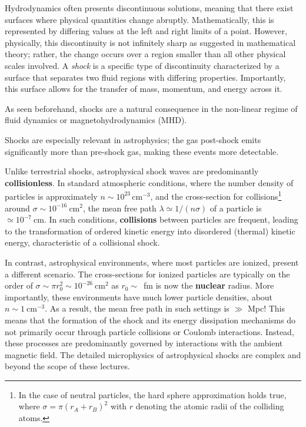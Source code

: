 Hydrodynamics often presents discontinuous solutions, meaning that there exist surfaces where physical quantities change abruptly. Mathematically, this is represented by differing values at the left and right limits of a point. However, physically, this discontinuity is not infinitely sharp as suggested in mathematical theory; rather, the change occurs over a region smaller than all other physical scales involved. 
%
A \emph{shock} is a specific type of discontinuity characterized by a surface that separates two fluid regions with differing properties. Importantly, this surface allows for the transfer of mass, momentum, and energy across it.

As seen beforehand, shocks are a natural consequence in the non-linear regime of fluid dynamics or magnetohydrodynamics (MHD).

Shocks are especially relevant in astrophysics; the gas post-shock emits significantly more than pre-shock gas, making these events more detectable.

Unlike terrestrial shocks, astrophysical shock waves are predominantly \textbf{collisionless}. 
%
In standard atmospheric conditions, where the number density of particles is approximately \( n \sim 10^{23} \, \text{cm}^{-3} \), and the cross-section for collisions\footnote{In the case of neutral particles, the hard sphere approximation holds true, where \( \sigma = \pi (r_A + r_B)^2 \) with \( r \) denoting the atomic radii of the colliding atoms.} around \( \sigma \sim 10^{-16}~\text{cm}^2 \), the mean free path \( \lambda \simeq 1 / (n \sigma) \) of a particle is \( \simeq 10^{-7}~\text{cm} \). 
%
In such conditions, \textbf{collisions} between particles are frequent, leading to the transformation of ordered kinetic energy into disordered (thermal) kinetic energy, characteristic of a collisional shock.

In contrast, astrophysical environments, where most particles are ionized, present a different scenario. The cross-sections for ionized particles are typically on the order of \( \sigma \sim \pi r_0^2 \sim 10^{-26}~\text{cm}^2 \) as $r_0 \sim$~fm is now the \textbf{nuclear} radius.
%
More importantly, these environments have much lower particle densities, about \( n \sim 1~\text{cm}^{-3} \). As a result, the mean free path in such settings is \( \gg \) Mpc! 
%
This means that the formation of the shock and its energy dissipation mechanisms do not primarily occur through particle collisions or Coulomb interactions. Instead, these processes are predominantly governed by interactions with the ambient magnetic field. The detailed microphysics of astrophysical shocks are complex and beyond the scope of these lectures.


